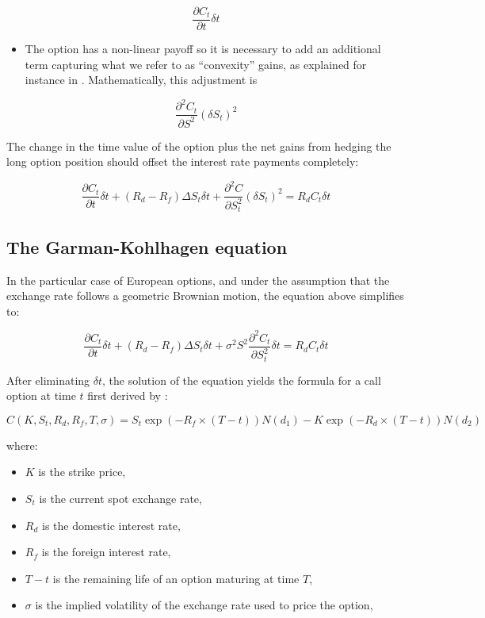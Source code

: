 \documentclass[]{book}
\providecommand{\tightlist}{%
  \setlength{\itemsep}{0pt}\setlength{\parskip}{0pt}}
\theoremstyle{definition}
\theoremstyle{definition}
\theoremstyle{definition}
\theoremstyle{remark}
\begin{document}
\[
\frac{\partial C_t}{\partial t} \delta t
\]

\begin{itemize}
\tightlist
\item
  The option has a non-linear payoff so it is necessary to add an
  additional term capturing what we refer to as ``convexity'' gains, as
  explained for instance in \citet{Neftci2008}. Mathematically, this
  adjustment is
\end{itemize}

\[
\frac{\partial^2 C_t}{\partial S^2} (\delta S_t)^2
\]

The change in the time value of the option plus the net gains from
hedging the long option position should offset the interest rate
payments completely:

\[
\frac{\partial C_t}{\partial t} \delta t + (R_d - R_f) \Delta S_t  \delta t + \frac{\partial^2 C}{\partial S_t^2} (\delta S_t)^2 = R_d C_t \delta t
\]

\subsection{The Garman-Kohlhagen
equation}\label{the-garman-kohlhagen-equation}

In the particular case of European options, and under the assumption
that the exchange rate follows a geometric Brownian motion, the equation
above simplifies to:

\[
\frac{\partial C_t}{\partial t} \delta t + (R_d - R_f) \Delta S_t  \delta t + \sigma^2 S^2\frac{\partial^2 C_t}{\partial S_t^2}\delta t  = R_d C_t \delta t
\]

After eliminating \(\delta t\), the solution of the equation yields the
formula for a call option at time \(t\) first derived by
\citet{Garman-Kohlhagen1983}:

\[
C(K,S_t,R_d,R_f,T,\sigma) = S_t \exp(-R_f\times(T-t))N(d_1) - K\exp(-R_d \times (T-t))N(d_2)
\]

where:

\begin{itemize}
\tightlist
\item
  \(K\) is the strike price,
\item
  \(S_t\) is the current spot exchange rate,
\item
  \(R_d\) is the domestic interest rate,
\item
  \(R_f\) is the foreign interest rate,
\item
  \(T-t\) is the remaining life of an option maturing at time \(T\),
\item
  \(\sigma\) is the implied volatility of the exchange rate used to
  price the option,
\end{itemize}
\end{document}

